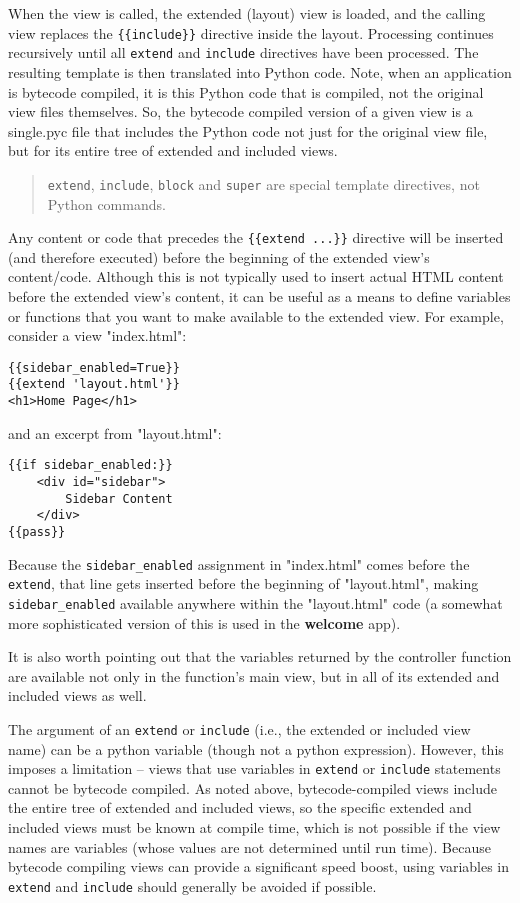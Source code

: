 \documentclass[justified,sixbynine,notoc]{tufte-book}
\def\ft{\small\tt}
\begin{document}
\begin{fullwidth}
When the view is called, the extended (layout) view is loaded, and the calling view replaces the {\ft \{\{include\}\}} directive inside the layout. Processing continues recursively until all {\ft extend} and {\ft include} directives have been processed. The resulting template is then translated into Python code. Note, when an application is bytecode compiled, it is this Python code that is compiled, not the original view files themselves. So, the bytecode compiled version of a given view is a single.pyc file that includes the Python code not just for the original view file, but for its entire tree of extended and included views.

\begin{quote}{\ft extend}, {\ft include}, {\ft block} and {\ft super} are special template directives,
not Python commands.\end{quote}
Any content or code that precedes the {\ft \{\{extend ...\}\}} directive will be inserted (and therefore executed) before the beginning of the extended view's content/code. Although this is not typically used to insert actual HTML content before the extended view's content, it can be useful as a means to define variables or functions that you want to make available to the extended view. For example, consider a view "index.html":
\begin{lstlisting}[keywords={}]
{{sidebar_enabled=True}}
{{extend 'layout.html'}}
<h1>Home Page</h1>
\end{lstlisting}
\noindent and an excerpt from "layout.html":
\begin{lstlisting}[keywords={}]
{{if sidebar_enabled:}}
    <div id="sidebar">
        Sidebar Content
    </div>
{{pass}}
\end{lstlisting}

Because the {\ft sidebar\_enabled} assignment in "index.html" comes before the {\ft extend}, that line gets inserted before the beginning of "layout.html", making {\ft sidebar\_enabled} available anywhere within the "layout.html" code (a somewhat more sophisticated version of this is used in the {\bf welcome} app).

It is also worth pointing out that the variables returned by the controller function are available not only in the function's main view, but in all of its extended and included views as well.

The argument of an {\ft extend} or {\ft include} (i.e., the extended or included view name) can be a python variable (though not a python expression). However, this imposes a limitation -- views that use variables in {\ft extend} or {\ft include} statements cannot be bytecode compiled. As noted above, bytecode-compiled views include the entire tree of extended and included views, so the specific extended and included views must be known at compile time, which is not possible if the view names are variables (whose values are not determined until run time). Because bytecode compiling views can provide a significant speed boost, using variables in {\ft extend} and {\ft include} should generally be avoided if possible.


\end{fullwidth}
\end{document}
